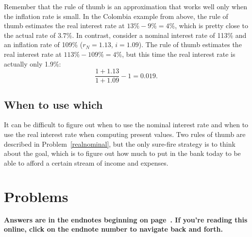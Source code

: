 Remember that the rule of thumb is an approximation that works well only when the inflation rate is small. In the Colombia example from above, the rule of thumb estimates the real interest rate at $13\% -9\% = 4\%$, which is pretty close to the actual rate of $3.7\%$. In contrast, consider a nominal interest rate of 113\% and an inflation rate of 109\% ($r_N=1.13$, $i=1.09$). The rule of thumb estimates the real interest rate at $113\% -109\% = 4\%$, but this time the real interest rate is actually only 1.9\%:
\[
\displaystyle \frac{1+1.13}{1+1.09} -1 = 0.019.
\]








\subsection*{When to use which}

It can be difficult to figure out when to use the nominal interest rate and when to use the real interest rate when computing present values. Two rules of thumb are described in Problem~\ref{realnominal}, but the only sure-fire strategy is to think about the goal, which is to figure out how much to put in the bank today to be able to afford a certain stream of income and expenses.






\bigskip
\bigskip
\section*{Problems}

\noindent \textbf{Answers are in the endnotes beginning on page~\pageref{1moretimea}. If you're reading this online, click on the endnote number to navigate back and forth.}

